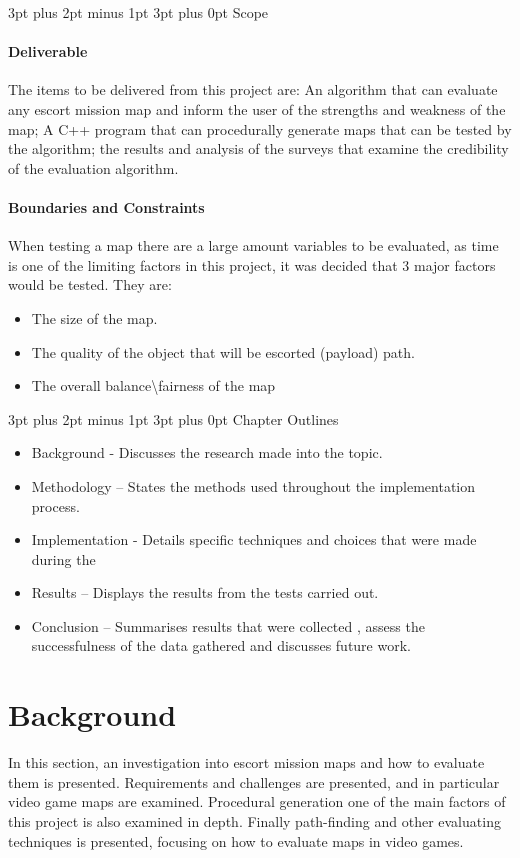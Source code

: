 \documentclass[12pt,a4paper,oneside]{book}
\makeatletter
\renewcommand\subsection{\@startsection {subsection}{1}{2mm} %
                               {3pt plus 2pt minus 1pt} %
                               {3pt plus 0pt} %
                               {\normalfont\bfseries}}
\makeatother
\begin{document}
\subsection{Scope}
\subsubsection{Deliverable}
The items to be delivered from this project are: An algorithm that can evaluate any escort mission map and inform the user of the strengths and weakness of the map; A C++ program that can procedurally generate maps that can be tested by the algorithm; the results and analysis of the surveys that examine the credibility of the evaluation algorithm.  
\subsubsection{Boundaries and Constraints}
When testing a map there are a large amount variables to be evaluated, as time is one of the limiting factors in this project, it was decided that 3 major factors would be tested. They are:
\begin{itemize}
	\item The size of the map.
	\item The quality of the object that will be escorted (payload) path.
	\item The overall balance\textbackslash fairness of the map 	
\end{itemize}
\subsection{Chapter Outlines}
\begin{itemize}
	\item Background - Discusses the research made into the topic.
	\item Methodology – States the methods used throughout the implementation process.
	\item Implementation - Details specific techniques and choices that were made during the 
	\item Results – Displays the results from the tests carried out.
	\item Conclusion – Summarises results that were collected , assess the successfulness of the data gathered and discusses future work.	
\end{itemize}

\chapter{Background}
In this section, an investigation into escort mission maps and how to evaluate them is presented. Requirements and challenges are presented, and in particular video game maps are examined. Procedural generation one of the main factors of this project is also examined in depth. Finally path-finding and other evaluating techniques is presented, focusing on how to evaluate maps in video games. 
\vspace{5mm} 
\newline
\end{document}
